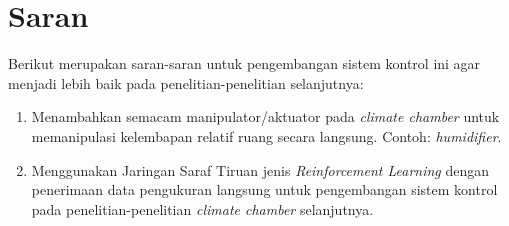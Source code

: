 \section{Saran}

Berikut merupakan saran-saran untuk pengembangan sistem kontrol ini agar menjadi lebih baik pada penelitian-penelitian selanjutnya:
\begin{enumerate}
	\item Menambahkan semacam manipulator/aktuator pada \textit{climate chamber} untuk memanipulasi kelembapan relatif ruang secara langsung. Contoh: \textit{humidifier}.
	\item Menggunakan Jaringan Saraf Tiruan jenis \textit{Reinforcement Learning} dengan penerimaan data pengukuran langsung untuk pengembangan sistem kontrol pada penelitian-penelitian \textit{climate chamber} selanjutnya.
\end{enumerate}

